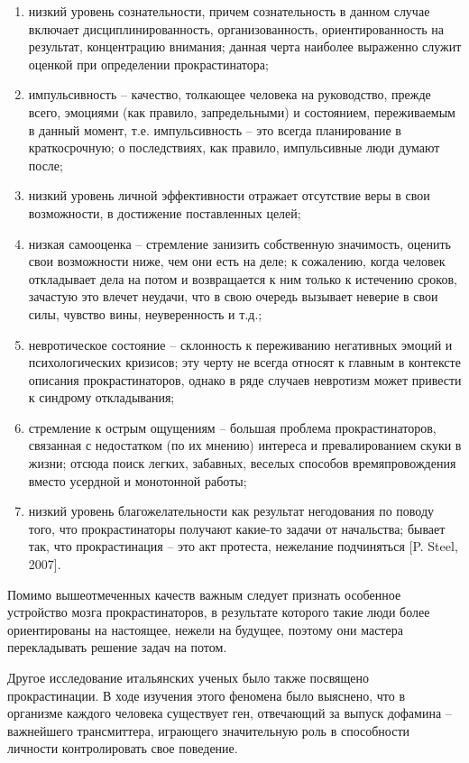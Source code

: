 \begin{enumerate}
    \item низкий уровень сознательности, причем сознательность в данном случае включает дисциплинированность, организованность, ориентированность на результат, концентрацию внимания; данная черта наиболее выраженно служит оценкой при определении прокрастинатора;
    \item импульсивность – качество, толкающее человека на руководство, прежде всего, эмоциями (как правило, запредельными) и состоянием, переживаемым в данный момент, т.е. импульсивность – это всегда планирование в краткосрочную; о последствиях, как правило, импульсивные люди думают после;
    \item низкий уровень личной эффективности отражает отсутствие веры в свои возможности, в достижение поставленных целей;
    \item низкая самооценка – стремление занизить собственную значимость, оценить свои возможности ниже, чем они есть на деле; к сожалению, когда человек откладывает дела на потом и возвращается к ним только к истечению сроков, зачастую это влечет неудачи, что в свою очередь вызывает неверие в свои силы, чувство вины, неуверенность и т.д.;
    \item невротическое состояние – склонность к переживанию негативных эмоций и психологических кризисов; эту черту не всегда относят к главным в контексте описания прокрастинаторов, однако в ряде случаев невротизм может привести к синдрому откладывания;
    \item стремление к острым ощущениям – большая проблема прокрастинаторов, связанная с недостатком (по их мнению) интереса и превалированием скуки в жизни; отсюда поиск легких, забавных, веселых способов времяпровождения вместо усердной и монотонной работы;
    \item низкий уровень благожелательности как результат негодования по поводу того, что прокрастинаторы получают какие-то задачи от начальства; бывает так, что прокрастинация – это акт протеста, нежелание подчиняться [P. Steel, 2007].
\end{enumerate}

Помимо вышеотмеченных качеств важным следует признать особенное устройство мозга прокрастинаторов, в результате которого такие люди более ориентированы на настоящее, нежели на будущее, поэтому они мастера перекладывать решение задач на потом.

Другое исследование итальянских ученых было также посвящено прокрастинации. В ходе изучения этого феномена было выяснено, что в организме каждого человека существует ген, отвечающий за выпуск дофамина – важнейшего трансмиттера, играющего значительную роль в способности личности контролировать свое поведение.

